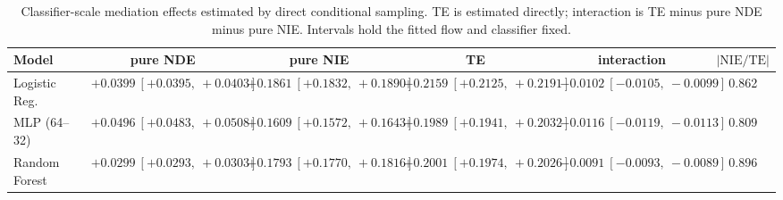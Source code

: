 \begin{table}[htbp]
  \centering
  \caption{Classifier-scale mediation effects estimated by direct conditional sampling. TE is estimated directly; interaction is TE minus pure NDE minus pure NIE. Intervals hold the fitted flow and classifier fixed.}
  \label{tab:german_synth_gap_overall}
  \begin{tabular}{lccccc}
    \toprule
    Model & pure NDE & pure NIE & TE & interaction & $|\mathrm{NIE}/\mathrm{TE}|$ \\
    \midrule
    Logistic Reg. & $+0.0399\ [+0.0395,\ +0.0403]$ & $+0.1861\ [+0.1832,\ +0.1890]$ & $+0.2159\ [+0.2125,\ +0.2191]$ & $-0.0102\ [-0.0105,\ -0.0099]$ & 0.862 \\
    MLP (64--32) & $+0.0496\ [+0.0483,\ +0.0508]$ & $+0.1609\ [+0.1572,\ +0.1643]$ & $+0.1989\ [+0.1941,\ +0.2032]$ & $-0.0116\ [-0.0119,\ -0.0113]$ & 0.809 \\
    Random Forest & $+0.0299\ [+0.0293,\ +0.0303]$ & $+0.1793\ [+0.1770,\ +0.1816]$ & $+0.2001\ [+0.1974,\ +0.2026]$ & $-0.0091\ [-0.0093,\ -0.0089]$ & 0.896 \\
    \bottomrule
  \end{tabular}
\end{table}